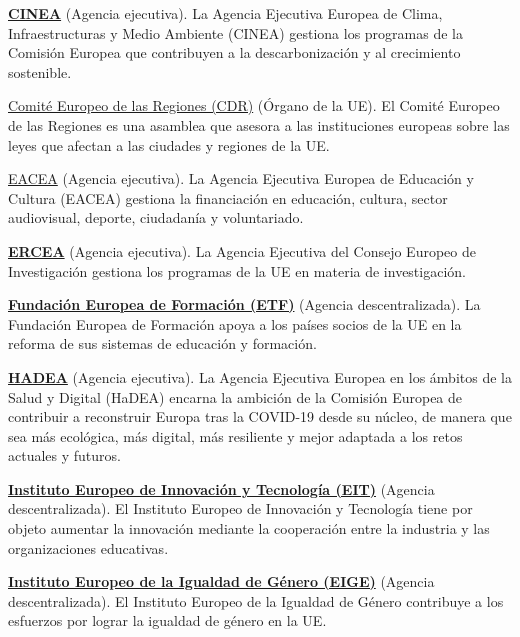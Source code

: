 \documentclass[10pt,a4paper]{article}
\begin{document}
\href{https://cinea.ec.europa.eu}{\textbf{CINEA}} (Agencia ejecutiva). La Agencia Ejecutiva Europea de Clima, Infraestructuras y Medio Ambiente (CINEA) gestiona los programas de la Comisión Europea que contribuyen a la descarbonización y al crecimiento sostenible.

\href{https://cor.europa.eu/es/Pages/default.aspx}{Comité Europeo de las Regiones (CDR)} (Órgano de la UE). El Comité Europeo de las Regiones es una asamblea que asesora a las instituciones europeas sobre las leyes que afectan a las ciudades y regiones de la UE.

\href{https://commission.europa.eu/about-european-commission/departments-and-executive-agencies/european-education-and-culture-executive-agency_es}{EACEA} (Agencia ejecutiva). La Agencia Ejecutiva Europea de Educación y Cultura (EACEA) gestiona la financiación en educación, cultura, sector audiovisual, deporte, ciudadanía y voluntariado.

\href{https://ec.europa.eu/info/departments/european-research-council_es}{\textbf{ERCEA}} (Agencia ejecutiva). La Agencia Ejecutiva del Consejo Europeo de Investigación gestiona los programas de la UE en materia de investigación.

\href{https://www.etf.europa.eu/es}{\textbf{Fundación Europea de Formación (ETF)}} (Agencia descentralizada). La Fundación Europea de Formación apoya a los países socios de la UE en la reforma de sus sistemas de educación y formación.

\href{https://ec.europa.eu/info/departments/european-health-and-digital-executive-agency_es}{\textbf{HADEA}} (Agencia ejecutiva). La Agencia Ejecutiva Europea en los ámbitos de la Salud y Digital (HaDEA) encarna la ambición de la Comisión Europea de contribuir a reconstruir Europa tras la COVID-19 desde su núcleo, de manera que sea más ecológica, más digital, más resiliente y mejor adaptada a los retos actuales y futuros.

\href{https://eit.europa.eu/}{\textbf{Instituto Europeo de Innovación y Tecnología (EIT)}} (Agencia descentralizada). El Instituto Europeo de Innovación y Tecnología tiene por objeto aumentar la innovación mediante la cooperación entre la industria y las organizaciones educativas.

\href{https://eige.europa.eu/}{\textbf{Instituto Europeo de la Igualdad de Género (EIGE)}} (Agencia descentralizada). El Instituto Europeo de la Igualdad de Género contribuye a los esfuerzos por lograr la igualdad de género en la UE.
\end{document}
